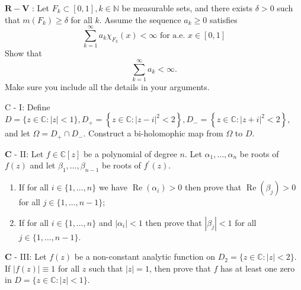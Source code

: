 \documentclass[14pt]{extarticle}
\begin{document}
$\mathbf{R}-\mathbf{V}$ : Let $F_{k} \subset[0,1], k \in \mathbb{N}$ be measurable sets, and there exists $\delta>0$ such that $m\left(F_{k}\right) \geq \delta$ for all $k$. Assume the sequence $a_{k} \geq 0$ satisfies
$$
\sum_{k=1}^{\infty} a_{k} \chi_{F_{k}}(x)<\infty \text { for a.e. } x \in[0,1]
$$
Show that
$$
\sum_{k=1}^{\infty} a_{k}<\infty .
$$
Make sure you include all the details in your arguments.
\newpage

C - I: Define $D=\{z \in \mathbb{C}:|z|<1\}, D_{+}=\left\{z \in \mathbb{C}:|z-i|^{2}<2\right\}, D_{-}=\left\{z \in \mathbb{C}:|z+i|^{2}<2\right\}$, and let $\Omega=D_{+} \cap D_{-}$. Construct a bi-holomophic map from $\Omega$ to $D$.
\newpage

$\mathbf{C}$ - II: Let $f \in \mathbb{C}[z]$ be a polynomial of degree $n$. Let $\alpha_{1}, \ldots, \alpha_{n}$ be roots of $f(z)$ and let $\beta_{1}, \ldots, \beta_{n-1}$ be roots of $f^{\prime}(z)$.

\begin{enumerate}
\item If for all $i \in\{1, \ldots, n\}$ we have $\operatorname{Re}\left(\alpha_{i}\right)>0$ then prove that $\operatorname{Re}\left(\beta_{j}\right)>0$ for all $j \in\{1, \ldots, n-1\}$;

\item If for all $i \in\{1, \ldots, n\}$ and $\left|\alpha_{i}\right|<1$ then prove that $\left|\beta_{j}\right|<1$ for all $j \in\{1, \ldots, n-1\}$.

\end{enumerate}
\newpage

$\mathbf{C}$ - III: Let $f(z)$ be a non-constant analytic function on $D_{2}=\{z \in \mathbb{C}:|z|<2\}$. If $|f(z)| \equiv 1$ for all $z$ such that $|z|=1$, then prove that $f$ has at least one zero in $D=\{z \in \mathbb{C}:|z|<1\}$.
\newpage
\end{document}
